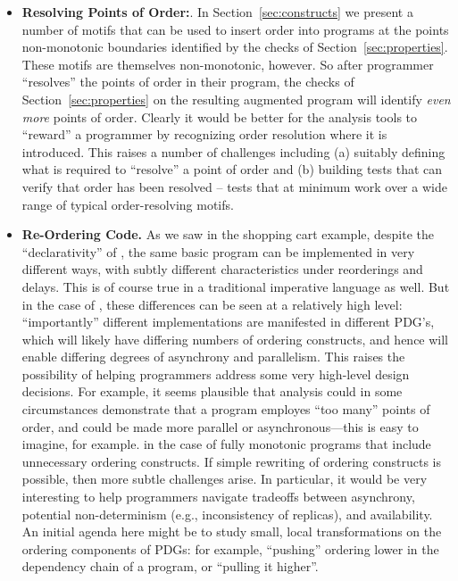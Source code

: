 \begin{itemize}
    \item {\bf Resolving Points of Order:}.  In Section~\ref{sec:constructs} we present a number of motifs that can be used to insert order into programs at the points non-monotonic boundaries identified by the checks of Section~\ref{sec:properties}.  These motifs are themselves non-monotonic, however.  So after programmer ``resolves'' the points of order in their program, the checks of Section~\ref{sec:properties} on the resulting augmented program will identify {\em even more} points of order.  Clearly it would be better for the analysis tools to ``reward'' a programmer by recognizing order resolution where it is introduced.  This raises a number of challenges including (a) suitably defining what is required to ``resolve'' a point of order and (b) building tests that can verify that order has been resolved -- tests that at minimum work over a wide range of typical order-resolving motifs.    
    
    \item {\bf Re-Ordering Code.} As we saw in the shopping cart example, despite the ``declarativity'' of \lang, the same basic program can be implemented in very different ways, with subtly different characteristics under reorderings and delays.  This is of course true in a traditional imperative language as well.  But in the case of \lang, these differences can be seen at a relatively high level: ``importantly'' different implementations are manifested in different PDG's, which will likely have differing numbers of ordering constructs, and hence will enable differing degrees of asynchrony and parallelism.  This raises the possibility of helping programmers address some very high-level design decisions.  For example, it seems plausible that analysis could in some circumstances demonstrate that a program employes ``too many'' points of order, and could be made more parallel or asynchronous---this is easy to imagine, for example. in the case of fully monotonic programs that include unnecessary ordering constructs.  If simple rewriting of ordering constructs is possible, then more subtle challenges arise.  In particular, it would be very interesting to help programmers navigate tradeoffs between asynchrony, potential non-determinism (e.g., inconsistency of replicas), and availability.  An initial agenda here might be to study small, local transformations on the ordering components of PDGs: for example, ``pushing'' ordering lower in the dependency chain of a program, or ``pulling it higher''.


\end{itemize}
